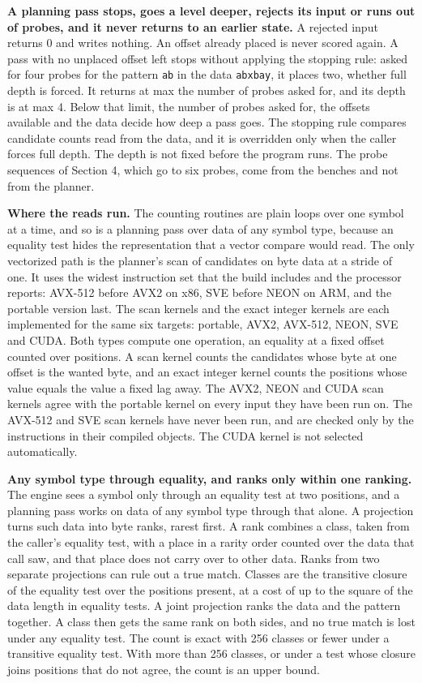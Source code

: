 \noindent\textbf{A planning pass stops, goes a level deeper, rejects its input or runs out of probes, and it never returns to an earlier state.} A rejected input returns 0 and writes nothing. An offset already placed is never scored again. A pass with no unplaced offset left stops without applying the stopping rule: asked for four probes for the pattern \texttt{ab} in the data \texttt{abxbay}, it places two, whether full depth is forced. It returns at max the number of probes asked for, and its depth is at max 4. Below that limit, the number of probes asked for, the offsets available and the data decide how deep a pass goes. The stopping rule compares candidate counts read from the data, and it is overridden only when the caller forces full depth. The depth is not fixed before the program runs. The probe sequences of Section 4, which go to six probes, come from the benches and not from the planner.

\noindent\textbf{Where the reads run.} The counting routines are plain loops over one symbol at a time, and so is a planning pass over data of any symbol type, because an equality test hides the representation that a vector compare would read. The only vectorized path is the planner's scan of candidates on byte data at a stride of one. It uses the widest instruction set that the build includes and the processor reports: AVX-512 before AVX2 on x86, SVE before NEON on ARM, and the portable version last. The scan kernels and the exact integer kernels are each implemented for the same six targets: portable, AVX2, AVX-512, NEON, SVE and CUDA. Both types compute one operation, an equality at a fixed offset counted over positions. A scan kernel counts the candidates whose byte at one offset is the wanted byte, and an exact integer kernel counts the positions whose value equals the value a fixed lag away. The AVX2, NEON and CUDA scan kernels agree with the portable kernel on every input they have been run on. The AVX-512 and SVE scan kernels have never been run, and are checked only by the instructions in their compiled objects. The CUDA kernel is not selected automatically.

\noindent\textbf{Any symbol type through equality, and ranks only within one ranking.} The engine sees a symbol only through an equality test at two positions, and a planning pass works on data of any symbol type through that alone. A projection turns such data into byte ranks, rarest first. A rank combines a class, taken from the caller's equality test, with a place in a rarity order counted over the data that call saw, and that place does not carry over to other data. Ranks from two separate projections can rule out a true match. Classes are the transitive closure of the equality test over the positions present, at a cost of up to the square of the data length in equality tests. A joint projection ranks the data and the pattern together. A class then gets the same rank on both sides, and no true match is lost under any equality test. The count is exact with 256 classes or fewer under a transitive equality test. With more than 256 classes, or under a test whose closure joins positions that do not agree, the count is an upper bound.


